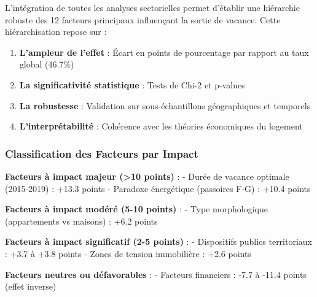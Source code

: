 \documentclass[11pt]{article}
\providecommand{\tightlist}{%
      \setlength{\itemsep}{0pt}\setlength{\parskip}{0pt}}
\begin{document}
L'intégration de toutes les analyses sectorielles permet d'établir une
hiérarchie robuste des 12 facteurs principaux influençant la sortie de
vacance. Cette hiérarchisation repose sur :

\begin{enumerate}
\def\labelenumi{\arabic{enumi}.}
\tightlist
\item
  \textbf{L'ampleur de l'effet} : Écart en points de pourcentage par
  rapport au taux global (46.7\%)
\item
  \textbf{La significativité statistique} : Tests de Chi-2 et p-values
\item
  \textbf{La robustesse} : Validation sur sous-échantillons
  géographiques et temporels
\item
  \textbf{L'interprétabilité} : Cohérence avec les théories économiques
  du logement
\end{enumerate}

\subsubsection{Classification des Facteurs par
Impact}\label{classification-des-facteurs-par-impact}

\textbf{Facteurs à impact majeur (\textgreater10 points)} : - Durée de
vacance optimale (2015-2019) : +13.3 points - Paradoxe énergétique
(passoires F-G) : +10.4 points

\textbf{Facteurs à impact modéré (5-10 points)} : - Type morphologique
(appartements vs maisons) : +6.2 points

\textbf{Facteurs à impact significatif (2-5 points)} : - Dispositifs
publics territoriaux : +3.7 à +3.8 points - Zones de tension immobilière
: +2.6 points

\textbf{Facteurs neutres ou défavorables} : - Facteurs financiers : -7.7
à -11.4 points (effet inverse)
\end{document}

